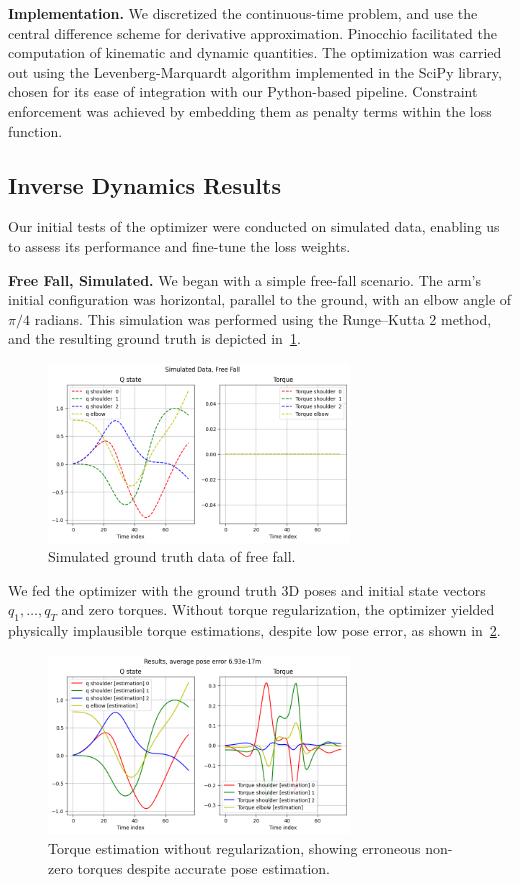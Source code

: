 \noindent\textbf{Implementation.} We discretized the continuous-time problem, 
and use the central difference scheme for derivative approximation. 
Pinocchio facilitated the computation of kinematic and dynamic quantities. 
The optimization was carried out using the Levenberg-Marquardt algorithm implemented in the SciPy library, 
chosen for its ease of integration with our Python-based pipeline. 
Constraint enforcement was achieved by embedding them as penalty terms within the loss function.

\subsection{Inverse Dynamics Results}
\label{subsec:dynamic_results}

Our initial tests of the optimizer were conducted on simulated data, enabling us to assess its performance and fine-tune the loss weights.

\noindent\textbf{Free Fall, Simulated.} We began with a simple free-fall scenario. The arm's initial configuration was horizontal, parallel to the ground, with an elbow angle of 
\(\pi/4\) radians. This simulation was performed using the Runge–Kutta 2 method, and the resulting ground truth is depicted 
in~\cref{fig:gt_free_fall}.

\begin{figure}
    \centering
    \includegraphics[width=8cm]{figures/free_fall_gt.png}
    \caption{Simulated ground truth data of free fall.}
    \label{fig:gt_free_fall}
\end{figure}

We fed the optimizer with the ground truth 3D poses and initial state vectors \(q_1, \ldots, q_T\) and zero torques. Without torque 
regularization, the optimizer yielded physically implausible torque estimations, despite low pose error, as shown 
in~\cref{fig:free_fall_no_torque}.

\begin{figure}
    \centering
    \includegraphics[width=8cm]{figures/free_fall_no_torque.png}
    \caption{Torque estimation without regularization, showing erroneous non-zero torques despite accurate pose estimation.}
    \label{fig:free_fall_no_torque}
\end{figure}

